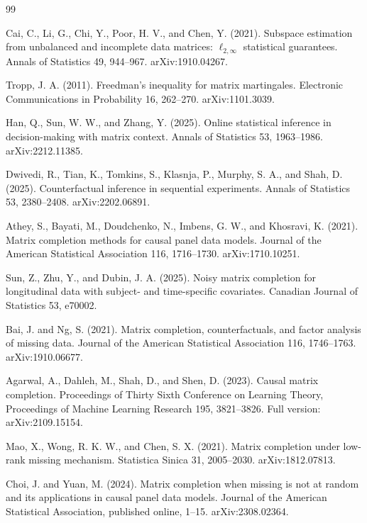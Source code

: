 \documentclass{article}
\begin{document}
\begin{thebibliography}{99}

   Cai, C., Li, G., Chi, Y., Poor, H. V., and Chen, Y. (2021). Subspace estimation from unbalanced and incomplete data matrices: \(\ell_{2,\infty}\) statistical guarantees. Annals of Statistics 49, 944--967. arXiv:1910.04267.

   Tropp, J. A. (2011). Freedman's inequality for matrix martingales. Electronic Communications in Probability 16, 262--270. arXiv:1101.3039.

   Han, Q., Sun, W. W., and Zhang, Y. (2025). Online statistical inference in decision-making with matrix context. Annals of Statistics 53, 1963--1986. arXiv:2212.11385.

   Dwivedi, R., Tian, K., Tomkins, S., Klasnja, P., Murphy, S. A., and Shah, D. (2025). Counterfactual inference in sequential experiments. Annals of Statistics 53, 2380--2408. arXiv:2202.06891.

   Athey, S., Bayati, M., Doudchenko, N., Imbens, G. W., and Khosravi, K. (2021). Matrix completion methods for causal panel data models. Journal of the American Statistical Association 116, 1716--1730. arXiv:1710.10251.

   Sun, Z., Zhu, Y., and Dubin, J. A. (2025). Noisy matrix completion for longitudinal data with subject- and time-specific covariates. Canadian Journal of Statistics 53, e70002.

   Bai, J. and Ng, S. (2021). Matrix completion, counterfactuals, and factor analysis of missing data. Journal of the American Statistical Association 116, 1746--1763. arXiv:1910.06677.

   Agarwal, A., Dahleh, M., Shah, D., and Shen, D. (2023). Causal matrix completion. Proceedings of Thirty Sixth Conference on Learning Theory, Proceedings of Machine Learning Research 195, 3821--3826. Full version: arXiv:2109.15154.

   Mao, X., Wong, R. K. W., and Chen, S. X. (2021). Matrix completion under low-rank missing mechanism. Statistica Sinica 31, 2005--2030. arXiv:1812.07813.

   Choi, J. and Yuan, M. (2024). Matrix completion when missing is not at random and its applications in causal panel data models. Journal of the American Statistical Association, published online, 1--15. arXiv:2308.02364.


\end{thebibliography}
\end{document}
